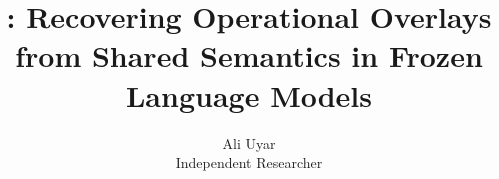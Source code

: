 \documentclass[10pt]{article}
\title{\method: Recovering Operational Overlays\\ from Shared Semantics in Frozen Language Models}
\author{
\name Ali Uyar \\
\addr Independent Researcher
}
\begin{document}
\maketitle

\begin{abstract}

\end{abstract}











\appendix



\end{document}
